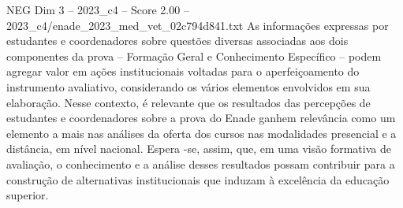 \begin{textsample}{NEG Dim 3 – 2023\_c4 – Score 2.00 – 2023\_c4/enade\_2023\_med\_vet\_02c794d841.txt}
As informações expressas por estudantes e coordenadores sobre questões diversas associadas aos dois componentes da prova – Formação Geral e Conhecimento Específico – podem agregar valor em ações institucionais voltadas para o aperfeiçoamento do instrumento avaliativo, considerando os vários elementos envolvidos em sua elaboração.
Nesse contexto, é relevante que os resultados das percepções de estudantes e coordenadores sobre a prova do Enade ganhem relevância como um elemento a mais nas análises da oferta dos cursos nas modalidades presencial e a distância, em nível nacional.
Espera -se, assim, que, em uma visão formativa de avaliação, o conhecimento e a análise desses resultados possam contribuir para a construção de alternativas institucionais que induzam à excelência da educação superior.

\end{textsample}
